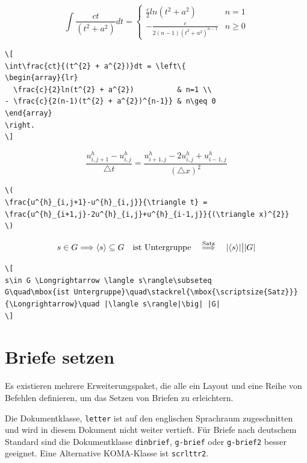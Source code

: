 \documentclass[a4paper,10pt,twoside]{scrbook}
\begin{document}
{\[
\int\frac{ct}{(t^{2} + a^{2})}dt = \left\{
\begin{array}{lr}
  \frac{c}{2}ln(t^{2} + a^{2})          & n=1 \\
- \frac{c}{2(n-1)(t^{2} + a^{2})^{n-1}} & n\geq 0
\end{array}
\right.
\]


\begin{lstlisting}[label=formelbeispiel8, style=customlatex]
\[
\int\frac{ct}{(t^{2} + a^{2})}dt = \left\{
\begin{array}{lr}
  \frac{c}{2}ln(t^{2} + a^{2})          & n=1 \\
- \frac{c}{2(n-1)(t^{2} + a^{2})^{n-1}} & n\geq 0
\end{array}
\right.
\]
\end{lstlisting}






\[
\frac{u^{h}_{i,j+1}-u^{h}_{i,j}}{\triangle t} = 
\frac{u^{h}_{i+1,j}-2u^{h}_{i,j}+u^{h}_{i-1,j}}{(\triangle x)^{2}}
\]

\begin{lstlisting}[label=formelbeispiel9, style=customlatex]
\(
\frac{u^{h}_{i,j+1}-u^{h}_{i,j}}{\triangle t} = 
\frac{u^{h}_{i+1,j}-2u^{h}_{i,j}+u^{h}_{i-1,j}}{(\triangle x)^{2}}
\)
\end{lstlisting}




\[
s\in G \Longrightarrow \langle s\rangle\subseteq 
G\quad\mbox{ist Untergruppe}\quad\stackrel{\mbox{\scriptsize{Satz}}}
{\Longrightarrow}\quad |\langle s\rangle|\big| |G|
\]


\begin{lstlisting}[label=formelbeispiel10, style=customlatex]
\[
s\in G \Longrightarrow \langle s\rangle\subseteq 
G\quad\mbox{ist Untergruppe}\quad\stackrel{\mbox{\scriptsize{Satz}}}
{\Longrightarrow}\quad |\langle s\rangle|\big| |G|
\]
\end{lstlisting}


\chapter{Briefe setzen}
\label{Kapitel_Briefe}

Es existieren mehrere Erweiterungspaket, die alle ein Layout und eine Reihe von Befehlen definieren, 
um das Setzen von Briefen zu erleichtern. 

Die Dokumentklasse, \verb!letter! ist auf den englischen Sprachraum zugeschnitten und wird in diesem Dokument nicht weiter vertieft. Für Briefe nach deutschem Standard sind die Dokumentklasse \verb!dinbrief!, \verb!g-brief! oder \verb!g-brief2! besser geeignet. 
Eine Alternative KOMA-Klasse ist \verb!scrlttr2!. 

}
\end{document}
